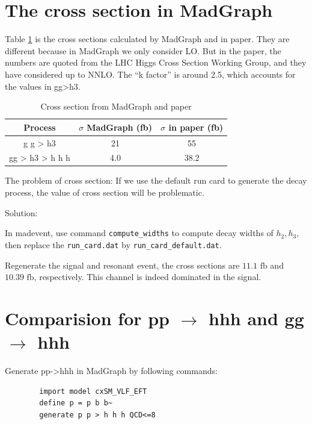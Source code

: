 \documentclass[12pt]{article}
\begin{document}
	
\section{The cross section in MadGraph}%
\label{sec:the_cross_section_in_madgraph}
Table \ref{tab:Cross_section_from_MadGraph_and_paper} is the cross sections calculated by MadGraph and in paper. They are different because in MadGraph we only consider LO. But in the paper, the numbers are quoted from the LHC Higgs Cross Section Working Group, and they have considered up to NNLO. The ``k factor'' is around 2.5, which accounts for the values in gg>h3.
	\begin{table}[htpb]
		\centering
		\caption{Cross section from MadGraph and paper}
		\label{tab:Cross_section_from_MadGraph_and_paper}
		\begin{tabular}{ccc}
			Process & $\sigma$  MadGraph (fb)  & $\sigma$ in paper (fb)\\
			\hline
			g g > h3 & 21 & 55 \\
			gg > h3 > h h h & 4.0 &  38.2 \\
			\hline
		\end{tabular}	
	\end{table}

	The problem of cross section: If we use the default run card to generate the decay process, the value of cross section will be problematic. 

	Solution:
	
	In madevent, use command \verb+compute_widths+ to compute decay widths of $h_2,h_3$, then replace the \verb+run_card.dat+ by \verb+run_card_default.dat+.

	Regenerate the signal and resonant event, the cross sections are $\text{11.1 fb}$ and $\text{10.39 fb}$, respectively. This channel is indeed dominated in the signal.
\section{Comparision for \texorpdfstring{pp $\to $ hhh}{pp to hhh} and gg \texorpdfstring{$\to $}{to} hhh}%
\label{sec:comparision_for_pp_to_hhh_and_gg_to_hhh}
	Generate pp->hhh in MadGraph by following commands:
	\begin{verbatim}
		import model cxSM_VLF_EFT
		define p = p b b~
		generate p p > h h h QCD<=8	
	\end{verbatim}
\end{document}
